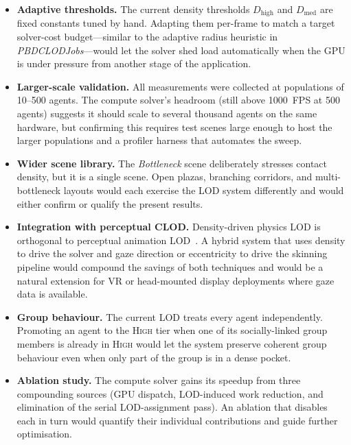 \begin{itemize}[topsep=2pt,itemsep=2pt]
    \item \textbf{Adaptive thresholds.}  The current density
    thresholds $D_{\mathrm{high}}$ and $D_{\mathrm{med}}$ are fixed
    constants tuned by hand.  Adapting them per-frame to match a
    target solver-cost budget---similar to the adaptive radius
    heuristic in \textit{PBDCLODJobs}---would let the solver shed load
    automatically when the GPU is under pressure from another stage of
    the application.

    \item \textbf{Larger-scale validation.}  All measurements were
    collected at populations of 10--500 agents.  The compute solver's
    headroom (still above 1000~FPS at 500 agents) suggests it should
    scale to several thousand agents on the same hardware, but
    confirming this requires test scenes large enough to host the
    larger populations and a profiler harness that automates the sweep.

    \item \textbf{Wider scene library.}  The \textit{Bottleneck} scene
    deliberately stresses contact density, but it is a single scene.
    Open plazas, branching corridors, and multi-bottleneck layouts
    would each exercise the LOD system differently and would either
    confirm or qualify the present results.

    \item \textbf{Integration with perceptual CLOD.}  Density-driven
    physics LOD is orthogonal to perceptual animation
    LOD~\cite{stancu}.  A hybrid system that uses density to drive
    the solver and gaze direction or eccentricity to drive the
    skinning pipeline would compound the savings of both techniques
    and would be a natural extension for VR or head-mounted display
    deployments where gaze data is available.

    \item \textbf{Group behaviour.}  The current LOD treats every
    agent independently.  Promoting an agent to the \textsc{High} tier
    when one of its socially-linked group members is already in
    \textsc{High} would let the system preserve coherent group
    behaviour even when only part of the group is in a dense pocket.

    \item \textbf{Ablation study.}  The compute solver gains its
    speedup from three compounding sources (GPU dispatch, LOD-induced
    work reduction, and elimination of the serial LOD-assignment
    pass).  An ablation that disables each in turn would quantify
    their individual contributions and guide further optimisation.
\end{itemize}
